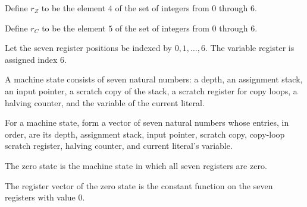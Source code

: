 \begin{definition}
\label{Complexity.LogProg.TQBFARM.rZ}
\leanok
Define $r_Z$ to be the element $4$ of the set of integers from $0$ through $6$.
\end{definition}

\begin{definition}
\label{Complexity.LogProg.TQBFARM.rC}
\leanok
Define $r_C$ to be the element $5$ of the set of integers from $0$ through $6$.
\end{definition}

\begin{definition}
\label{Complexity.LogProg.TQBFARM.rV}
\leanok
Let the seven register positions be indexed by $0,1,\ldots,6$. The variable register is
assigned index $6$.
\end{definition}

\begin{definition}
\label{Complexity.LogProg.TQBFARM.St}
\leanok
A machine state consists of seven natural numbers: a depth, an assignment stack, an
input pointer, a scratch copy of the stack, a scratch register for copy loops, a halving
counter, and the variable of the current literal.
\end{definition}

\begin{definition}
\label{Complexity.LogProg.TQBFARM.St.toV}
\leanok
{}
For a machine state, form a vector of seven natural numbers whose entries, in order, are
its depth, assignment stack, input pointer, scratch copy, copy-loop scratch register,
halving counter, and current literal's variable.
\end{definition}

\begin{definition}
\label{Complexity.LogProg.TQBFARM.St.zero}
\leanok
{}
The zero state is the machine state in which all seven registers are zero.
\end{definition}

\begin{lemma}
\label{Complexity.LogProg.TQBFARM.St.toV_zero}
\leanok
{}
The register vector of the zero state is the constant function on the seven registers
with value $0$.
\end{lemma}

